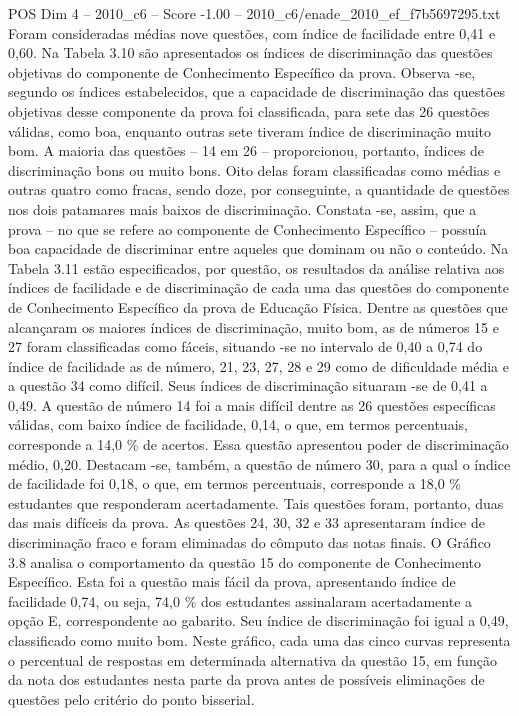 \begin{textsample}{POS Dim 4 – 2010\_c6 – Score -1.00 – 2010\_c6/enade\_2010\_ef\_f7b5697295.txt}
Foram consideradas médias nove questões, com índice de facilidade entre 0,41 e 0,60.
Na Tabela 3.10 são apresentados os índices de discriminação das questões objetivas do componente de Conhecimento Específico da prova.
Observa -se, segundo os índices estabelecidos, que a capacidade de discriminação das questões objetivas desse componente da prova foi classificada, para sete das 26 questões válidas, como boa, enquanto outras sete tiveram índice de discriminação muito bom.
A maioria das questões – 14 em 26 – proporcionou, portanto, índices de discriminação bons ou muito bons.
Oito delas foram classificadas como médias e outras quatro como fracas, sendo doze, por conseguinte, a quantidade de questões nos dois patamares mais baixos de discriminação.
Constata -se, assim, que a prova – no que se refere ao componente de Conhecimento Específico – possuía boa capacidade de discriminar entre aqueles que dominam ou não o conteúdo.
Na Tabela 3.11 estão especificados, por questão, os resultados da análise relativa aos índices de facilidade e de discriminação de cada uma das questões do componente de Conhecimento Específico da prova de Educação Física.
Dentre as questões que alcançaram os maiores índices de discriminação, muito bom, as de números 15 e 27 foram classificadas como fáceis, situando -se no intervalo de 0,40 a 0,74 do índice de facilidade as de número, 21, 23, 27, 28 e 29 como de dificuldade média e a questão 34 como difícil.
Seus índices de discriminação situaram -se de 0,41 a 0,49.
A questão de número 14 foi a mais difícil dentre as 26 questões específicas válidas, com baixo índice de facilidade, 0,14, o que, em termos percentuais, corresponde a 14,0 \% de acertos.
Essa questão apresentou poder de discriminação médio, 0,20.
Destacam -se, também, a questão de número 30, para a qual o índice de facilidade foi 0,18, o que, em termos percentuais, corresponde a 18,0 \% estudantes que responderam acertadamente.
Tais questões foram, portanto, duas das mais difíceis da prova.
As questões 24, 30, 32 e 33 apresentaram índice de discriminação fraco e foram eliminadas do cômputo das notas finais.
O Gráfico 3.8 analisa o comportamento da questão 15 do componente de Conhecimento Específico.
Esta foi a questão mais fácil da prova, apresentando índice de facilidade 0,74, ou seja, 74,0 \% dos estudantes assinalaram acertadamente a opção E, correspondente ao gabarito.
Seu índice de discriminação foi igual a 0,49, classificado como muito bom.
Neste gráfico, cada uma das cinco curvas representa o percentual de respostas em determinada alternativa da questão 15, em função da nota dos estudantes nesta parte da prova antes de possíveis eliminações de questões pelo critério do ponto bisserial.

\end{textsample}
